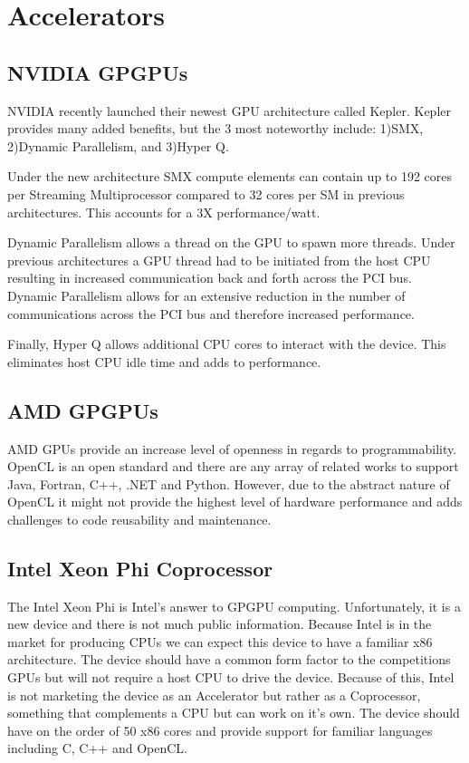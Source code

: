 \documentclass[conference]{IEEEtran}
\begin{document}
\section{Accelerators}

\subsection{NVIDIA GPGPUs}
NVIDIA recently launched their newest GPU architecture called Kepler. \cite{NVIDIA_Kepler} Kepler provides many added benefits, but the 3 most noteworthy include: 1)SMX,  2)Dynamic Parallelism, and 3)Hyper Q.

Under the new architecture SMX compute elements can contain up to 192 cores per Streaming Multiprocessor compared to 32 cores per SM in previous architectures. This accounts for a 3X performance/watt.

Dynamic Parallelism allows a thread on the GPU to spawn more threads. Under previous architectures a GPU thread had to be initiated from the host CPU resulting in increased communication back and forth across the PCI bus. Dynamic Parallelism allows for an extensive reduction in the number of communications across the PCI bus and therefore increased performance.

Finally, Hyper Q allows additional CPU cores to interact with the device. This eliminates host CPU idle time and adds to performance.

\subsection{AMD GPGPUs}
AMD GPUs provide an increase level of openness in regards to programmability. \cite{AMD_web} OpenCL is an open standard and there are any array of related works to support Java, Fortran, C++, .NET and Python. However, due to the abstract nature of OpenCL it might not provide the highest level of hardware performance and adds challenges to code reusability and maintenance.

\subsection{Intel Xeon Phi Coprocessor}
The Intel Xeon Phi is Intel's answer to GPGPU computing.\cite{Xeon_Phi_web} Unfortunately, it is a new device and there is not much public information. Because Intel is in the market for producing CPUs we can expect this device to have a familiar x86 architecture. The device should have a common form factor to the competitions GPUs but will not require a host CPU to drive the device. Because of this, Intel is not marketing the device as an Accelerator but rather as a Coprocessor, something that complements a CPU but can work on it's own. The device should have on the order of 50 x86 cores and provide support for familiar languages including C, C++ and OpenCL.
\end{document}
